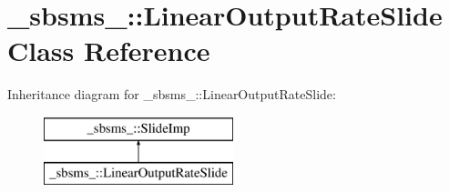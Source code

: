 \hypertarget{class__sbsms___1_1_linear_output_rate_slide}{}\section{\+\_\+sbsms\+\_\+\+:\+:Linear\+Output\+Rate\+Slide Class Reference}
\label{class__sbsms___1_1_linear_output_rate_slide}
Inheritance diagram for \+\_\+sbsms\+\_\+\+:\+:Linear\+Output\+Rate\+Slide\+:\begin{figure}[H]
\begin{center}
\leavevmode
\includegraphics[height=2.000000cm]{class__sbsms___1_1_linear_output_rate_slide}
\end{center}
\end{figure}
